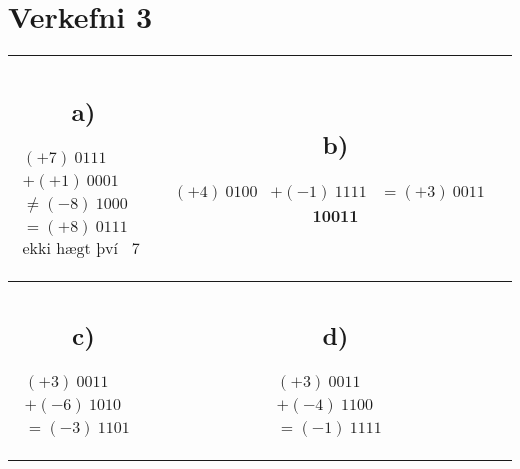 \documentclass{article}
\begin{document}
\section*{Verkefni 3}
\begin{tabular}{|c|c|}
    \hline
    \parbox{6cm}{\subsection*{a)}
    \begin{align*}
        (+7) \ 0111&\\
        + (+1) \ 0001&\\
        \hline
        \neq (-8) \ 1000&\\
        = (+8) \ 0111 &\\
        \text{ekki hægt því +tölur ná bara upp í } 7
    \end{align*}} &
    \parbox{6cm}{\subsection*{b)}
    \begin{align*}
        (+4) \ 0100&\\
        + (-1) \ 1111&\\
        \hline
        = (+3) \ 0011&\\
    \end{align*}\\
      \\
     \\
     10011}\\
    \hline
    \parbox{6cm}{
        \subsection*{c)}    
        \begin{align*}
          (+3) \ 0011&\\
        + (-6) \ 1010&\\
        \hline
        = (-3) \ 1101&
        \end{align*}} &
        \parbox{6cm}{
        \subsection*{d)}    
        \begin{align*}
          (+3) \ 0011&\\
        + (-4) \ 1100&\\
        \hline
        =  (-1) \ 1111&
          \end{align*}}\\ 
          \hline
\end{tabular}
\end{document}

